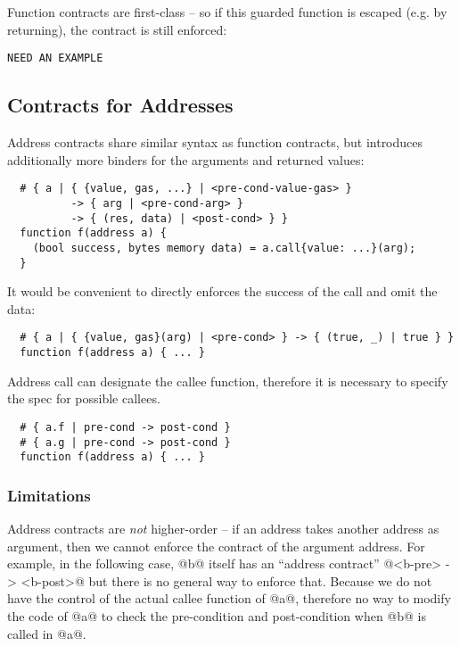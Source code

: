 Function contracts are first-class -- so if this guarded function is escaped
(e.g. by returning), the contract is still enforced:
\begin{lstlisting}
NEED AN EXAMPLE
\end{lstlisting}


\subsection{Contracts for Addresses}

Address contracts share similar syntax as function contracts, but introduces
additionally more binders for the arguments and returned values:

\begin{lstlisting}
  # { a | { {value, gas, ...} | <pre-cond-value-gas> }
          -> { arg | <pre-cond-arg> }
          -> { (res, data) | <post-cond> } }
  function f(address a) {
    (bool success, bytes memory data) = a.call{value: ...}(arg);
  }
\end{lstlisting}

It would be convenient to directly enforces the success of the call and omit
the data:
\begin{lstlisting}
  # { a | { {value, gas}(arg) | <pre-cond> } -> { (true, _) | true } }
  function f(address a) { ... }
\end{lstlisting}

Address call can designate the callee function, therefore it is necessary to
specify the spec for possible callees.

\begin{lstlisting}
  # { a.f | pre-cond -> post-cond }
  # { a.g | pre-cond -> post-cond }
  function f(address a) { ... }
\end{lstlisting}


\subsubsection*{Limitations}
Address contracts are \emph{not} higher-order -- if an address takes another
address as argument, then we cannot enforce the contract of the argument
address.
For example, in the following case, @b@ itself has an ``address contract''
@<b-pre> -> <b-post>@ but there is no general way to enforce that.
Because we do not have the control of the actual callee function of @a@,
therefore no way to modify the code of @a@ to check the pre-condition
and post-condition when @b@ is called in @a@.

